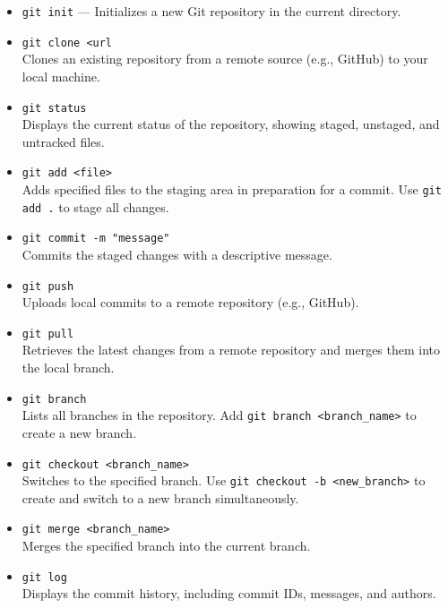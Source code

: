 \documentclass[12pt]{article}
\begin{document}
\begin{itemize}
    \item[] \texttt{git init} — Initializes a new Git repository in the current directory.

    \item[] \texttt{git clone <url} \\Clones an existing repository from a remote source (e.g., GitHub) to your local machine.

    \item[] \texttt{git status} \\Displays the current status of the repository, showing staged, unstaged, and untracked files.

    \item[] \texttt{git add <file>} \\Adds specified files to the staging area in preparation for a commit. Use \texttt{git add .} to stage all changes.

    \item[] \texttt{git commit -m "message"} \\Commits the staged changes with a descriptive message.

    \item[] \texttt{git push} \\Uploads local commits to a remote repository (e.g., GitHub).

    \item[] \texttt{git pull} \\Retrieves the latest changes from a remote repository and merges them into the local branch.

    \item[] \texttt{git branch} \\Lists all branches in the repository. Add \texttt{git branch <branch\_name>} to create a new branch.

    \item[] \texttt{git checkout <branch\_name>} \\Switches to the specified branch. Use \texttt{git checkout -b <new\_branch>} to create and switch to a new branch simultaneously.

    \item[] \texttt{git merge <branch\_name>} \\Merges the specified branch into the current branch.

    \item[] \texttt{git log} \\Displays the commit history, including commit IDs, messages, and authors.


\end{itemize}
\end{document}
